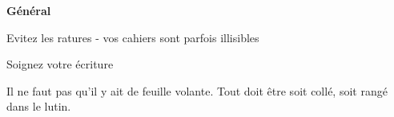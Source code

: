 \documentclass[answers]{exam}
\begin{document}
\vspace{1em}
\noindent\textbf{\large Général}\par\vspace{0.5\baselineskip}

\begin{compactitem}
  \item Evitez les ratures - vos cahiers sont parfois illisibles
  \item Soignez votre écriture
  \item Il ne faut pas qu'il y ait de feuille volante. Tout doit être soit collé, soit rangé dans le lutin. 
\end{compactitem}
\end{document}
